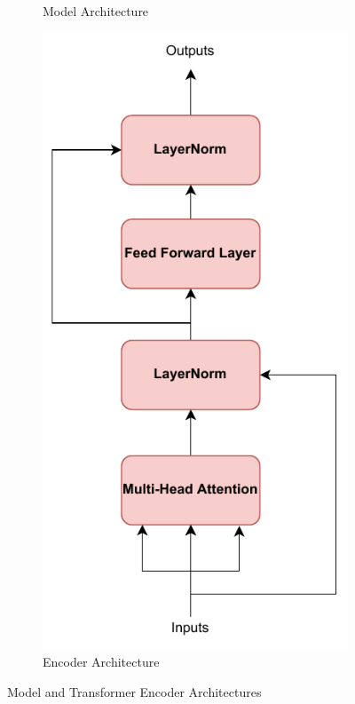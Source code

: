 \documentclass[journal]{IEEEtran}
\begin{document}
\begin{figure}
\begin{subfigure}{0.49\linewidth}
      \caption{Model Architecture}
      \label{fig: model architecture}
  \end{subfigure}
  \begin{subfigure}{0.49\linewidth}
    \centering
    \includegraphics[width=\linewidth, height=2\linewidth]{images/transformer.pdf}
    \caption{Encoder Architecture}
    \label{fig: encoder architecture}
  \end{subfigure}
  \caption{Model and Transformer Encoder Architectures}
\end{figure}
\end{document}

